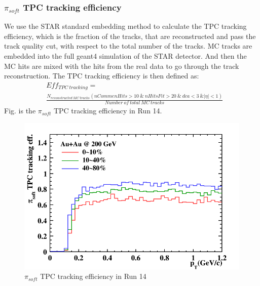 \subsubsection{$\pi_{soft}$ TPC tracking efficiency}
We use the STAR standard embedding method to calculate the TPC tracking efficiency, which is the fraction of the tracks, that are reconstructed and pass the track quality cut, with respect to the total number of the tracks. MC tracks are embedded into the full geant4 simulation of the STAR detector. And then the MC hits are mixed with the hits from the real data to go through the track reconstruction. The TPC tracking efficiency is then defined as:
\begin{equation}
\begin{aligned}
&Eff_{TPC~tracking} = \\
& \frac{N_{reconstructed~MC~tracks}(nCommenHits>10~\&~nHitsFit>20~\&~dca<3~\&|\eta|<1)}{Number~of~total~MC~tracks}
 \end{aligned}
\end{equation}
Fig. is the $\pi_{soft}$ TPC tracking efficiency in Run 14.
\begin{figure}
	\centering
	\includegraphics[scale=0.4]{dstarplots/piTPCeff.png}
	\caption{$\pi_{soft}$ TPC tracking efficiency in Run 14}
	\label{fig:piTPCeff}
\end{figure}
